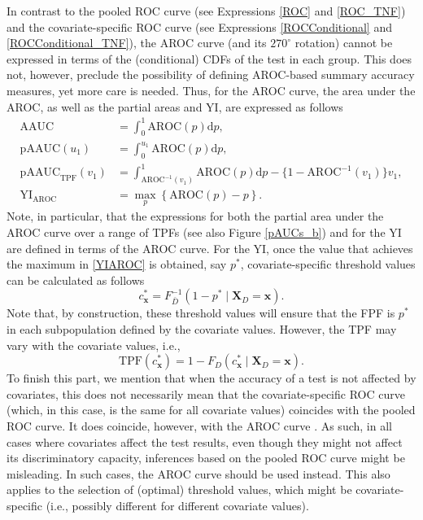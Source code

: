 In contrast to the pooled ROC curve (see Expressions \eqref{ROC} and \eqref{ROC_TNF}) and the covariate-specific ROC curve (see Expressions \eqref{ROCConditional} and \eqref{ROCConditional_TNF}), the AROC curve (and its $270^\circ$ rotation) cannot be expressed in terms of the (conditional) CDFs of the test in each group. This does not, however, preclude the possibility of defining AROC-based summary accuracy measures, yet more care is needed. Thus, for the AROC curve, the area under the AROC, as well as the partial areas and YI, are expressed as follows
\begin{align}
\text{AAUC} & =  \int_{0}^{1}\text{AROC}(p)\text{d}p, \label{AAUCConditional}\\
\text{pAAUC}(u_1) & =  \int_{0}^{u_1}\text{AROC}(p)\text{d}p, \label{pAAUCConditional}\\
\text{pAAUC}_{\text{TPF}}(v_1) & =  \int_{\text{AROC}^{-1}(v_1)}^{1}\text{AROC}(p)\text{d}p - \{1-\text{AROC}^{-1}(v_1)\}v_1, \label{pAUCConditional3}\\
\text{YI}_{\text{AROC}} & =   \max_{p}\left\{\text{AROC}(p)-p\right\} \label{YIAROC}.
\end{align}
Note, in particular, that the expressions for both the partial area under the AROC curve over a range of TPFs (see also Figure \ref{pAUCs_b}) and for the YI are defined in terms of the AROC curve. For the YI, once the value that achieves the maximum in \eqref{YIAROC} is obtained, say $p^{*}$, covariate-specific threshold values can be calculated as follows
\[
c^{*}_{\mathbf{x}} = F_{\bar{D}}^{-1}(1-p^{*}\mid \mathbf{X}_{D} = \mathbf{x}).
\]
Note that, by construction, these threshold values will ensure that the FPF is $p^{*}$ in each subpopulation defined by the covariate values. However, the TPF may vary with the covariate values, i.e.,
\[
\text{TPF}\left(c^{*}_{\mathbf{x}}\right) = 1 - F_{D}\left(c^{*}_{\mathbf{x}} \mid \mathbf{X}_{D} = \mathbf{x} \right).
\]
To finish this part, we mention that when the accuracy of a test is not affected by covariates, this does not necessarily mean that the covariate-specific ROC curve (which, in this case, is the same for all covariate values) coincides with the pooled ROC curve. It does coincide, however, with the AROC curve \citep[see][for more details]{Janes09a, Pardo14, Inacio18}. As such, in all cases where covariates affect the test results, even though they might not affect its discriminatory capacity, inferences based on the pooled ROC curve might be misleading. In such cases, the AROC curve should be used instead. This also applies to the selection of (optimal) threshold values, which might be covariate-specific (i.e., possibly different for different covariate values). 

